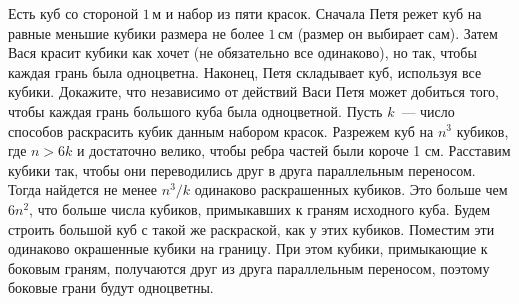 \problem{}
Есть куб со стороной $1\,\text{м}$ и набор из пяти красок.
Сначала Петя режет куб на равные меньшие кубики размера не более
$1\,\text{см}$ (размер он выбирает сам).
Затем Вася красит кубики как хочет (не обязательно все одинаково), но так,
чтобы каждая грань была одноцветна.
Наконец, Петя складывает куб, используя все кубики.
Докажите, что независимо от действий Васи Петя может добиться того, чтобы
каждая грань большого куба была одноцветной.
\solution
Пусть $k$~--- число способов раскрасить кубик данным набором красок.
Разрежем куб на $n^3$ кубиков, где $n > 6 k$ и достаточно велико, чтобы ребра
частей были короче 1 см.
Расставим кубики так, чтобы они переводились друг в друга параллельным
переносом.
Тогда найдется не менее $n^3 / k$ одинаково раскрашенных кубиков.
Это больше чем $6 n^2$, что больше числа кубиков, примыкавших к граням
исходного куба.
Будем строить большой куб с такой же раскраской, как у этих кубиков.
Поместим эти одинаково окрашенные кубики на границу.
При этом кубики, примыкающие к боковым граням, получаются друг из друга
параллельным переносом, поэтому боковые грани будут одноцветны. 
\endproblem
